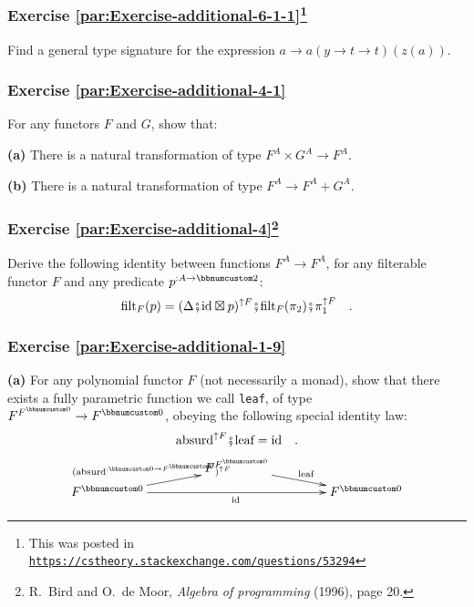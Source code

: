 \subsubsection{Exercise \label{par:Exercise-additional-6-1-1}\ref{par:Exercise-additional-6-1-1}\protect\footnote{This was posted in \texttt{\protect\href{https://cstheory.stackexchange.com/questions/53294}{https://cstheory.stackexchange.com/questions/53294}}}}

Find a general type signature for the expression $a\rightarrow a(y\rightarrow t\rightarrow t)(z(a))$. 

\subsubsection{Exercise \label{par:Exercise-additional-4-1}\ref{par:Exercise-additional-4-1}}

For any functors $F$ and $G$, show that:

\textbf{(a)} There is a natural transformation of type $F^{A}\times G^{A}\rightarrow F^{A}$.

\textbf{(b)} There is a natural transformation of type $F^{A}\rightarrow F^{A}+G^{A}$.

\subsubsection{Exercise \label{par:Exercise-additional-4}\ref{par:Exercise-additional-4}\protect\footnote{R.~Bird and O.~de Moor, \emph{Algebra of programming} (1996), page
20.}}

Derive the following identity between functions $F^{A}\rightarrow F^{A}$,
for any filterable functor $F$ and any predicate $p^{:A\rightarrow\bbnum 2}$:
\[
\text{filt}_{F}(p)=(\Delta\bef\text{id}\boxtimes p)^{\uparrow F}\bef\text{filt}_{F}(\pi_{2})\bef\pi_{1}^{\uparrow F}\quad.
\]


\subsubsection{Exercise \label{par:Exercise-additional-1-9}\ref{par:Exercise-additional-1-9}}

\textbf{(a)} For any polynomial functor $F$ (not necessarily a monad),
show that there exists a fully parametric function we call \lstinline!leaf!,
of type $F^{F^{\bbnum 0}}\rightarrow F^{\bbnum 0}$, obeying the following
special identity law:
\[
\text{absurd}^{\uparrow F}\bef\text{leaf}=\text{id}\quad.
\]
\[
\xymatrix{\xyScaleY{0.3pc}\xyScaleX{3.5pc} & F^{F^{\bbnum 0}}\ar[rd]\sp(0.5){\ \text{leaf}}\\
F^{\bbnum 0}\ar[ru]\sp(0.5){(\text{absurd}^{:\bbnum 0\rightarrow F^{\bbnum 0}})^{\uparrow F}\ \ }\ar[rr]\sb(0.5){\text{id}\,} &  & F^{\bbnum 0}
}
\]


